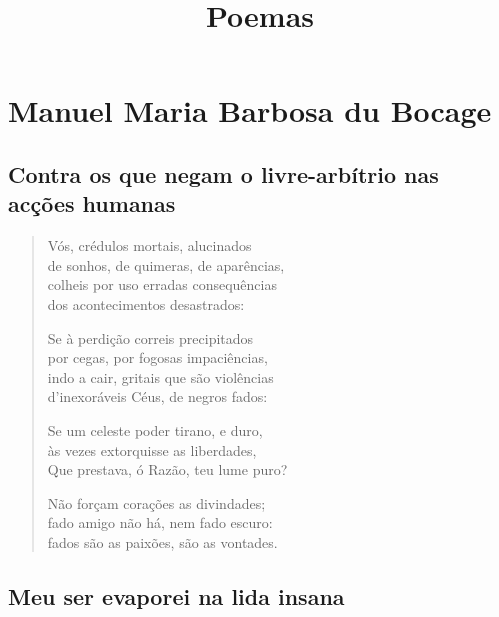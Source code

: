 \documentclass[10pt,a5paper,oneside]{book}
\begin{document}
\pagestyle{empty}

\title{Poemas}
\author{}
\date{}
\maketitle

\frontmatter
\tableofcontents

\mainmatter

\part{Manuel Maria Barbosa du Bocage}

\chapter{Contra os que negam o livre-arbítrio nas acções humanas}

\begin{verse}
Vós, crédulos mortais, alucinados\\
de sonhos, de quimeras, de aparências,\\
colheis por uso erradas consequências\\
dos acontecimentos desastrados:

Se à perdição correis precipitados\\
por cegas, por fogosas impaciências,\\
indo a cair, gritais que são violências\\
d'inexoráveis Céus, de negros fados:

Se um celeste poder tirano, e duro,\\
às vezes extorquisse as liberdades,\\
Que prestava, ó Razão, teu lume puro?

Não forçam corações as divindades;\\
fado amigo não há, nem fado escuro:\\
fados são as paixões, são as vontades.
\end{verse}

\chapter{Meu ser evaporei na lida insana}
\end{document}
